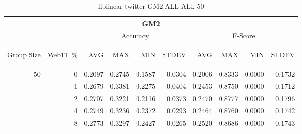 \begin{center}
\begin{table}[htbp]
\begin{tabular}{ | r | r | r | r | r | r | r | r | r | r |}
\hline
\multicolumn{10}{|c|}{GM2}\\
\hline
 & & \multicolumn{4}{|c|}{Accuracy} & \multicolumn{4}{|c|}{F-Score}\\ \cline{3-10}
\begin{sideways}Group Size\end{sideways} & \begin{sideways}Web1T \%\end{sideways} & \begin{sideways}AVG\end{sideways} & \begin{sideways}MAX\end{sideways} & \begin{sideways}MIN\end{sideways} & \begin{sideways}STDEV\end{sideways} & \begin{sideways}AVG\end{sideways} & \begin{sideways}MAX\end{sideways} & \begin{sideways}MIN\end{sideways} & \begin{sideways}STDEV\end{sideways}\\
\hline
\multirow{5}{*}{50}
 & 0 & 0.2097 & 0.2745 & 0.1587 & 0.0304 & 0.2006 & 0.8333 & 0.0000 & 0.1732\\ \cline{2-10}
 & 1 & 0.2679 & 0.3381 & 0.2275 & 0.0404 & 0.2453 & 0.8750 & 0.0000 & 0.1712\\ \cline{2-10}
 & 2 & 0.2707 & 0.3221 & 0.2116 & 0.0373 & 0.2470 & 0.8777 & 0.0000 & 0.1796\\ \cline{2-10}
 & 4 & 0.2749 & 0.3236 & 0.2372 & 0.0293 & 0.2464 & 0.8760 & 0.0000 & 0.1742\\ \cline{2-10}
 & 8 & 0.2773 & 0.3297 & 0.2427 & 0.0265 & 0.2520 & 0.8686 & 0.0000 & 0.1743\\ \cline{2-10}
\hline
\end{tabular}
\caption{liblinear-twitter-GM2-ALL-ALL-50}
\end{table}
\end{center}

